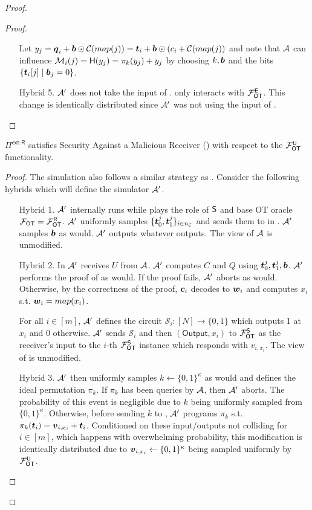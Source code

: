 \begin{proof}
\begin{proof}
\begin{enumerate}[leftmargin=1.8cm]
			Let $y_{j}= \boldsymbol{q}_i+\boldsymbol{b}\odot \mathcal{C}(map(j))=\boldsymbol{t}_i + \boldsymbol{b} \odot (c_i + \mathcal{C}(map(j))$ and note that $\mathcal{A}$ can influence $\mathcal{M}_i(j)=\mathsf{H}(y_j)=\pi_k(y_j)+y_j$ by choosing $k,\boldsymbol{b}$ and the bits $\{\boldsymbol{t}_i[j] \mid \boldsymbol{b}_j=0\}$.
			
			\item[Hybrid 5.] $\mathcal{A}'$ does not take the input of \rec. \rec only interacts with $\mathcal{F}_{\mathsf{OT}}^\mathsf{E}$. This change is identically distributed since $\mathcal{A}'$ was not using the input of \rec.
		\end{enumerate}
		\pe
	\end{proof}
	\begin{claim}\label{claim:ext-R-S-MalReceiver}
		$\Pi^{\textsf{ext-R}}$ satisfies Security Against a Malicious Receiver () with respect to the $\mathcal{F}_{\mathsf{OT}}^\mathsf{U}$ functionality.
	\end{claim}
	\begin{proof}
		The simulation also follows a similar strategy as . Consider the following hybrids which will define the simulator $\mathcal{A}'$. 
		\begin{enumerate}[leftmargin=1.8cm]
			\item[Hybrid 1.] $\mathcal{A}'$ internally runs \Adv while plays the role of $\mathsf{S}$ and base OT oracle $\mathcal{F}_{\mathsf{OT}}=\mathcal{F}_{\mathsf{OT}}^\mathsf{R}$. $\mathcal{A}'$ uniformly samples $\{\boldsymbol{t}^j_0,\boldsymbol{t}^j_1\}_{i\in{n_\mathcal{C}}}$ and sends them to \Adv in . $\mathcal{A}'$ samples $\boldsymbol{b}$ as \send would. $\mathcal{A}'$ outputs whatever \Adv outputs. The view of $\mathcal{A}$ is unmodified.
			
			\item[Hybrid 2.] In  $\mathcal{A}'$ receives $U$ from $\mathcal{A}$.  $\mathcal{A}'$ computes $C$ and $Q$ using $\boldsymbol{t}_0^j,\boldsymbol{t}_1^j,\boldsymbol{b}$. $\mathcal{A}'$ performs the proof of  as \send would. If the proof fails, $\mathcal{A}'$ aborts as \send would. Otherwise, by the correctness of the proof, $\boldsymbol{c}_i$ decodes to $\boldsymbol{w}_i$ and computes $x_i$ s.t. $\boldsymbol{w}_i=map(x_i)$. 
			
			For all $i\in[m]$, $\mathcal{A}'$ defines the circuit $\mathcal{S}_i:[N]\rightarrow\{0,1\}$ which outputs 1 at $x_i$ and 0 otherwise. $\mathcal{A}'$ sends $\mathcal{S}_i$ and then $(\textsf{Output}, x_i)$ to $\mathcal{F}_{\mathsf{OT}}^\mathsf{S}$ as the receiver's input to the $i$-th  $\mathcal{F}_{\mathsf{OT}}^\mathsf{S}$ instance which responds with $v_{i,x_i}$. The view of \Adv is unmodified.
			
			
			\item[Hybrid 3.] $\mathcal{A}'$ then uniformly samples $k\gets\{0,1\}^\kappa$ as \send would and defines the ideal permutation $\pi_k$. If $\pi_k$ has been queries by $\mathcal{A}$, then $\mathcal{A}'$ aborts. The probability of this event is negligible due to $k$ being uniformly sampled from $\{0,1\}^\kappa$. Otherwise, before sending $k$ to \send, $\mathcal{A}'$ programs $\pi_k$ s.t.  $\pi_k(\boldsymbol{t}_i)=\boldsymbol{v}_{i, x_i}+\boldsymbol{t}_i$. Conditioned on these input/outputs not colliding for $i\in[m]$, which happens with overwhelming probability, this modification is identically distributed due to $\boldsymbol{v}_{i, x_i}\gets\{0,1\}^\kappa$ being sampled uniformly by $\mathcal{F}_{\mathsf{OT}}^\mathsf{U}$.
			

\end{enumerate}
\end{proof}
\end{proof}
